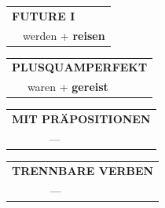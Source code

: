 \documentclass[10pt,a4paper]{revtex4-2}
\begin{document}
\begin{verbbox}
\begin{tabular}{rl}
    \multicolumn{2}{l}{\textbf{FUTURE I} }\\
  &  werden + \textbf{reisen}\\
 
  \end{tabular}
\hfill
   \begin{tabular}{rl}
      \multicolumn{2}{l}{\textbf{PLUSQUAMPERFEKT}}\\
  &  waren + \textbf{gereist}\\
  \end{tabular}
  
  \vspace{10pt}



\begin{tabular}{lll}
\multicolumn{3}{l}{\textbf{MIT PRÄPOSITIONEN}}\\
& ---\\
\end{tabular}
\hfill
\begin{tabular}{lll}
\multicolumn{3}{l}{\textbf{TRENNBARE VERBEN}}\\
& ---\\
\end{tabular}

  \vspace{-5pt}

\end{verbbox}
\end{document}

